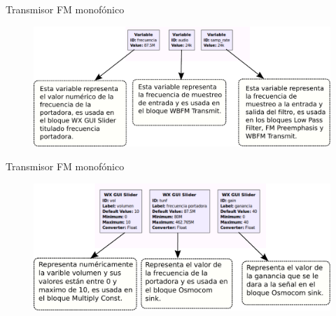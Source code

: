 \begin{frame}{Transmisor FM monofónico}

\begin{figure}[H]
\centering
\vspace{-3mm}
\includegraphics[width=\textwidth]{parte3/lab11/pdf/lab11_2.pdf}
\end{figure}


\end{frame}

\begin{frame}{Transmisor FM monofónico}

\begin{figure}[H]
\centering
\vspace{-3mm}
\includegraphics[width=\textwidth]{parte3/lab11/pdf/lab11_3.pdf}
\end{figure}

\end{frame}

